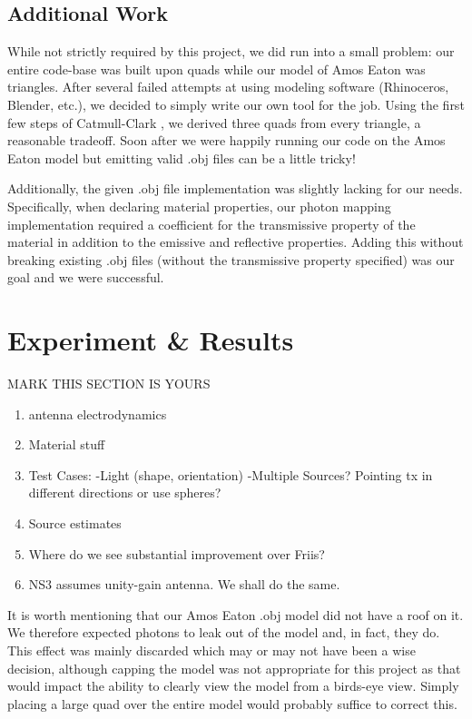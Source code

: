 \documentclass[%
        final,
        notitlepage,
        narroweqnarray,
        inline,
        twoside,
        ]{ieee}
\begin{document}
\subsection{Additional Work}
While not strictly required by this project, we did run into a small problem:
our entire code-base was built upon quads while our model of Amos Eaton was
triangles.  After several failed attempts at using modeling software
(Rhinoceros, Blender, etc.), we decided to simply write our own tool for the
job.  Using the first few steps of Catmull-Clark \cite{Catmull1978350}, we
derived three quads from every triangle, a reasonable tradeoff.  Soon after we
were happily running our code on the Amos Eaton model but emitting valid .obj
files can be a little tricky!

Additionally, the given .obj file implementation was slightly lacking for our
needs.  Specifically, when declaring material properties, our photon mapping
implementation required a coefficient for the transmissive property of the
material in addition to the emissive and reflective properties.  Adding this
without breaking existing .obj files (without the transmissive property
specified) was our goal and we were successful.

\section{Experiment \& Results}
MARK THIS SECTION IS YOURS

\begin{enumerate}

\item antenna electrodynamics

\item Material stuff

\item Test Cases:
-Light (shape, orientation)\newline
-Multiple Sources? Pointing tx in different directions or use spheres?

\item Source estimates

\item Where do we see substantial improvement over Friis?

\item NS3 assumes unity-gain antenna.  We shall do the same.

\end{enumerate}

It is worth mentioning that our Amos Eaton .obj model did not have a roof on it.
We therefore expected photons to leak out of the model and, in fact, they do.
This effect was mainly discarded which may or may not have been a wise
decision, although capping the model was not appropriate for this project as
that would impact the ability to clearly view the model from a birds-eye view.
Simply placing a large quad over the entire model would probably suffice to
correct this.
\end{document}
